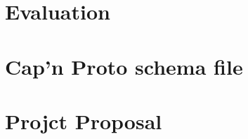 \documentclass[12pt,twoside,notitlepage]{report}
\begin{document}

\newpage



\newpage



\newpage



% 

\chapter{Evaluation}
\newpage



\cleardoublepage




\newpage


\appendix

\chapter{Cap'n Proto schema file}
\label{appendix:schema}



\chapter{Projct Proposal}
\label{appendix:proposal}

\end{document}

